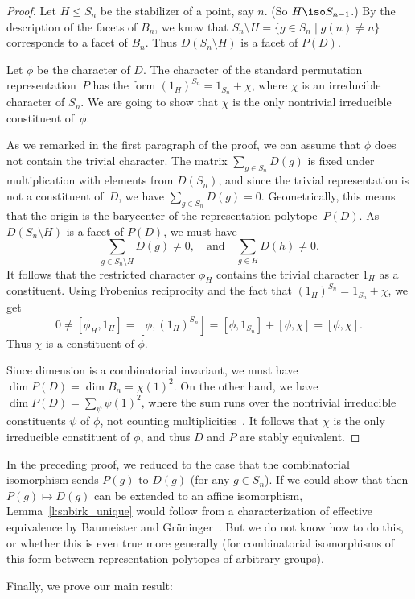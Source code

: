 \begin{proof}
  
  
    Let $H \leq S_{n}$ be the stabilizer of a point,
    say $n$. (So $H\iso S_{n-1}$.)
    By the description of the facets of $B_n$, we know that
    $S_n \setminus H = \{g \in S_n\mid g(n)\neq n\}$
    corresponds to a facet of $B_n$.
    Thus $D(S_n\setminus H)$ is a facet of $P(D)$.
      
    Let $\phi$ be the character of $D$.
    The character of the standard permutation representation~$P$
    has the form  $(1_H)^{S_n} = 1_{S_n} + \chi$,
    where $\chi$ is an irreducible character of $S_n$.
    We are going to show that $\chi$ is the only 
    nontrivial irreducible constituent of~$\phi$.
    
    As we remarked in the first paragraph of the proof,
    we can assume that $\phi$ 
    does not contain the trivial character.
    The matrix $\sum_{g\in S_n} D(g)$ is fixed under
    multiplication with elements from $D(S_n)$,
    and since the trivial representation is not a constituent of~$D$,
    we have $\sum_{g\in S_n} D(g) = 0$.
    Geometrically, this means that
    the origin is the barycenter 
    of the representation polytope~$P(D)$.
    As $D(S_n\setminus H)$ is a facet of $P(D)$,
    we must have
      \[ \sum_{g\in S_n \setminus H} D(g) \neq 0
         ,\quad \text{and} \quad 
          \sum_{g\in  H} D(h) \neq 0.
      \]
    It follows that the restricted character
    $\phi_H$ contains the trivial character $1_H$
    as a constituent.
    Using Frobenius reciprocity and the fact that
    $(1_H)^{S_n} = 1_{S_n} + \chi$, we get 
    \[ 0 \neq [\phi_H, 1_H ] = [\phi, (1_H)^{S_n}]
       = [\phi,1_{S_n}] + [\phi,\chi] =  [\phi,\chi].  
    \]
    Thus $\chi$ is a constituent of $\phi$.

  Since dimension is a combinatorial invariant, we must have
  $\dim P(D) = \dim B_n = \chi(1)^2 $.
  On the other hand, we have
  $\dim P(D) = \sum_{\psi} \psi(1)^2$,
  where the sum runs over the nontrivial 
  irreducible constituents $\psi$ of $\phi$,
  not counting multiplicities~\cite[Theorem~3.2]{guralnickperkinson06}.
  It follows that $\chi$ is the only irreducible constituent of $\phi$,
  and thus $D$ and $P$ are stably equivalent.
\end{proof}

\begin{remark}
  In the preceding proof,
  we reduced to the case that the combinatorial isomorphism
  sends $P(g)$ to $D(g)$ (for any $g\in S_n$).
  If we could show that then $P(g)\mapsto D(g)$ 
  can be extended to an affine isomorphism, 
  Lemma~\ref{l:snbirk_unique} would follow
  from a characterization of effective equivalence
  by Baumeister and 
  Grüninger~\cite[Corollary~4.5]{BaumeisterGrueninger15}.
  But we do not know how to do this, or whether this is even true
  more generally 
  (for combinatorial isomorphisms of this form between
  representation polytopes of arbitrary groups).
\end{remark}  



Finally, we prove our main result:

